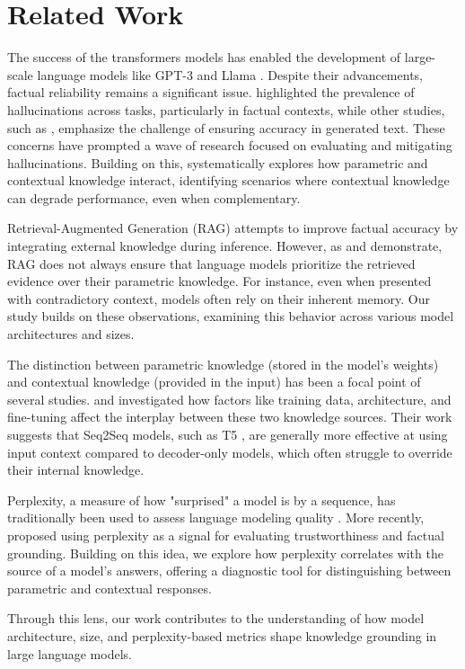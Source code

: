 \section{Related Work}

The success of the transformers models \citep{attention_is_all_you_need} has enabled the development of large-scale language models like GPT-3 \citep{gpt3} and Llama \citep{llama}.
Despite their advancements, factual reliability remains a significant issue.
\citeauthor{how_can_we_know} highlighted the prevalence of hallucinations across tasks, particularly in factual contexts, while other studies, such as \citep{can_rag_models_reason,gpt2}, emphasize the challenge of ensuring accuracy in generated text.
These concerns have prompted a wave of research focused on evaluating and mitigating hallucinations.
Building on this, \citeauthor{understanding_the_interplay} systematically explores how parametric and contextual knowledge interact, identifying scenarios where contextual knowledge can degrade performance, even when complementary.

Retrieval-Augmented Generation (RAG) \citep{rag,atlas_foundational,retro} attempts to improve factual accuracy by integrating external knowledge during inference.
However, as \citeauthor{ragged} and \citeauthor{factual_recall} demonstrate, RAG does not always ensure that language models prioritize the retrieved evidence over their parametric knowledge.
For instance, even when presented with contradictory context, models often rely on their inherent memory.
Our study builds on these observations, examining this behavior across various model architectures and sizes.

The distinction between parametric knowledge (stored in the model's weights) and contextual knowledge (provided in the input) has been a focal point of several studies.
\citeauthor{factual_recall} and \citeauthor{knowledge_grounding_retrieval_augmented} investigated how factors like training data, architecture, and fine-tuning affect the interplay between these two knowledge sources.
Their work suggests that Seq2Seq models, such as T5 \citep{t5,flant5}, are generally more effective at using input context compared to decoder-only models, which often struggle to override their internal knowledge.

Perplexity, a measure of how "surprised" a model is by a sequence, has traditionally been used to assess language modeling quality \citep{how_can_we_know}.
More recently, \citeauthor{learning_the_difference} proposed using perplexity as a signal for evaluating trustworthiness and factual grounding.
Building on this idea, we explore how perplexity correlates with the source of a model's answers, offering a diagnostic tool for distinguishing between parametric and contextual responses.

Through this lens, our work contributes to the understanding of how model architecture, size, and perplexity-based metrics shape knowledge grounding in large language models.

